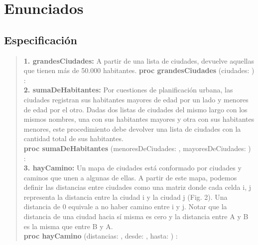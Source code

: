\documentclass[10pt,a4paper]{article}
\begin{document}
\maketitle
\section {Enunciados}
\subsection{Especificación}

\begin{quote}
	\vspace{0.2cm}
	\textbf{1. grandesCiudades:} A partir de una lista de ciudades, devuelve aquellas que tienen más de 50.000 habitantes.  
	\textbf{proc grandesCiudades} (\In ciudades: ) : 
	\vspace{0.2cm}
	\\
	\vspace{0.2cm}
	\textbf{2. sumaDeHabitantes:} Por cuestiones de planificación urbana, las ciudades registran sus habitantes mayores de edad por un lado y menores de edad por el otro. Dadas dos listas de ciudades del mismo largo con los mismos nombres, una con sus habitantes mayores y otra con sus habitantes menores, este procedimiento debe devolver una lista de ciudades con la cantidad total de sus habitantes.
	\\
	\vspace{0.2cm}
	\textbf{proc sumaDeHabitantes} (\In menoresDeCiudades: , \In mayoresDeCiudades: ) : 
	\\
	\vspace{0.2cm}
	\textbf{3. hayCamino:} Un mapa de ciudades está conformado por ciudades y caminos que unen a algunas de ellas. A partir de este mapa, podemos definir las distancias entre ciudades como una matriz donde cada celda i, j representa la distancia entre la ciudad i y la ciudad j (Fig. 2). Una distancia de 0 equivale a no haber camino entre i y j. Notar que la distancia de una ciudad hacia sí misma es cero y la distancia entre A y B es la misma que entre B y A.
	\vspace{0.2cm}
	\\
	\vspace{0.2cm}
	\textbf{proc hayCamino} (\In distancias: \matriz{\ent}, \In desde: \ent, \In hasta: \ent) : \bool
	\vspace{0.2cm}
	\\
	\vspace{0.2cm}

\end{quote}
\end{document}
